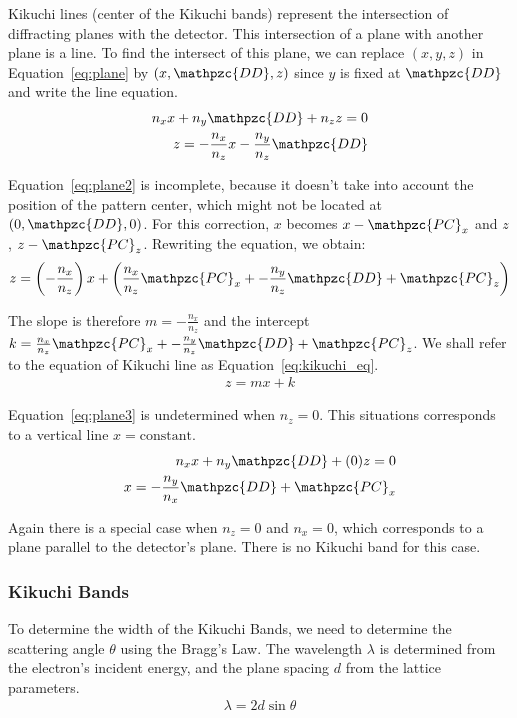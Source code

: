 \documentclass[letterpaper]{article}
\newcommand{\var}[1]{\mathpzc{#1}}
\begin{document}
	Kikuchi lines (center of the Kikuchi bands) represent the intersection of diffracting planes with the detector.  
	This intersection of a plane with another plane is a line.
	To find the intersect of this plane, we can replace $(x,y,z)$ in Equation~\ref{eq:plane} by $(x, \var{DD}, z)$ since $y$ is fixed at $\var{DD}$ and write the line equation.
	\begin{eqnarray}
		n_x x + n_y \var{DD} + n_z z = 0 \\\nonumber
		z = -\frac{n_x}{n_z}x - \frac{n_y}{n_z}\var{DD}
		\label{eq:plane2}
	\end{eqnarray}
	
	Equation~\ref{eq:plane2} is incomplete, because it doesn't take into account the position of the pattern center, which might not be located at $(0,\var{DD},0)$. 
	For this correction, $x$ becomes $x-\var{PC}_x$ and $z$, $z-\var{PC}_z$.
	Rewriting the equation, we obtain:
	\begin{eqnarray}
		z = \left(-\frac{n_x}{n_z}\right)x + \left(\frac{n_x}{n_z}\var{PC}_x + - \frac{n_y}{n_z}\var{DD} + \var{PC}_z\right)
		\label{eq:plane3}
	\end{eqnarray}
	
	The slope is therefore $m=-\frac{n_x}{n_z}$ and the intercept $k=\frac{n_x}{n_z}\var{PC}_x + - \frac{n_y}{n_z}\var{DD} + \var{PC}_z$. We shall refer to the equation of Kikuchi line as Equation~\ref{eq:kikuchi_eq}.
	\begin{eqnarray}
		z = mx + k
		\label{eq:kikuchi_eq}
	\end{eqnarray}

	Equation~\ref{eq:plane3} is undetermined when $n_z = 0$. 
	This situations corresponds to a vertical line $x = \text{constant}$.
	\begin{eqnarray}
		n_x x + n_y \var{DD} + (0) z = 0 \\\nonumber
		x = -\frac{n_y}{n_x}\var{DD} + \var{PC}_x
		\label{eq:plane4}
	\end{eqnarray}
	
	Again there is a special case when $n_z = 0$ and $n_x = 0$, which corresponds to a plane parallel to the detector's plane. 
	There is no Kikuchi band for this case.
	
	\subsubsection{Kikuchi Bands}
	To determine the width of the Kikuchi Bands, we need to determine the scattering angle $\theta$ using the Bragg's Law. The wavelength $\lambda$ is determined from the electron's incident energy, and the plane spacing $d$ from the lattice parameters.
	\begin{eqnarray}
		\lambda = 2d\sin\theta
		\label{eq:bragg}
	\end{eqnarray}
	
\end{document}
